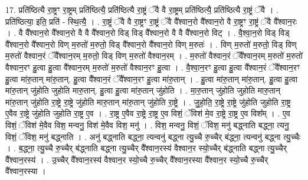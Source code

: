 \documentclass[17pt]{extarticle}
\begin{document}
17. प्रति॑ष्ठित्यै रा॒ष्ट्रꣳ रा॒ष्ट्रम् प्रति॑ष्ठित्यै॒ प्रति॑ष्ठित्यै रा॒ष्ट्रं ॅवै वै रा॒ष्ट्रम् प्रति॑ष्ठित्यै॒ प्रति॑ष्ठित्यै रा॒ष्ट्रं ॅवै । . प्रति॑ष्ठित्या॒ इति॒ प्रति॑ - स्थि॒त्यै॒ । . रा॒ष्ट्रं ॅवै वै रा॒ष्ट्रꣳ रा॒ष्ट्रं ॅवै वै᳚श्वान॒रो वै᳚श्वान॒रो वै रा॒ष्ट्रꣳ रा॒ष्ट्रं ॅवै वै᳚श्वान॒रः । . वै वै᳚श्वान॒रो वै᳚श्वान॒रो वै वै वै᳚श्वान॒रो विड् विड् वै᳚श्वान॒रो वै वै वै᳚श्वान॒रो विट् । . वै॒श्वा॒न॒रो विड् विड् वै᳚श्वान॒रो वै᳚श्वान॒रो विण् म॒रुतो॑ म॒रुतो॒ विड् वै᳚श्वान॒रो वै᳚श्वान॒रो विण् म॒रुतः॑ । . विण् म॒रुतो॑ म॒रुतो॒ विड् विण् म॒रुतो॑ वैश्वान॒रं ॅवै᳚श्वान॒रम् म॒रुतो॒ विड् विण् म॒रुतो॑ वैश्वान॒रम् । . म॒रुतो॑ वैश्वान॒रं ॅवै᳚श्वान॒रम् म॒रुतो॑ म॒रुतो॑ वैश्वान॒रꣳ हु॒त्वा हु॒त्वा वै᳚श्वान॒रम् म॒रुतो॑ म॒रुतो॑ वैश्वान॒रꣳ हु॒त्वा । . वै॒श्वा॒न॒रꣳ हु॒त्वा हु॒त्वा वै᳚श्वान॒रं ॅवै᳚श्वान॒रꣳ हु॒त्वा मा॑रु॒तान् मा॑रु॒तान्. हु॒त्वा वै᳚श्वान॒रं ॅवै᳚श्वान॒रꣳ हु॒त्वा मा॑रु॒तान् । . हु॒त्वा मा॑रु॒तान् मा॑रु॒तान्. हु॒त्वा हु॒त्वा मा॑रु॒तान् जु॑होति जुहोति मारु॒तान्. हु॒त्वा हु॒त्वा मा॑रु॒तान् जु॑होति । . मा॒रु॒तान् जु॑होति जुहोति मारु॒तान् मा॑रु॒तान् जु॑होति रा॒ष्ट्रे रा॒ष्ट्रे जु॑होति मारु॒तान् मा॑रु॒तान् जु॑होति रा॒ष्ट्रे । . जु॒हो॒ति॒ रा॒ष्ट्रे रा॒ष्ट्रे जु॑होति जुहोति रा॒ष्ट्र ए॒वैव रा॒ष्ट्रे जु॑होति जुहोति रा॒ष्ट्र ए॒व । . रा॒ष्ट्र ए॒वैव रा॒ष्ट्रे रा॒ष्ट्र ए॒व विशं॒ ॅविश॑ मे॒व रा॒ष्ट्रे रा॒ष्ट्र ए॒व विश᳚म् । . ए॒व विशं॒ ॅविश॑ मे॒वैव विश॒ मन्वनु॒ विश॑ मे॒वैव विश॒ मनु॑ । . विश॒ मन्वनु॒ विशं॒ ॅविश॒ मनु॑ बद्ध्नाति बद्ध्ना॒ त्यनु॒ विशं॒ ॅविश॒ मनु॑ बद्ध्नाति । . अनु॑ बद्ध्नाति बद्ध्ना॒ त्यन्वनु॑ बद्ध्ना त्यु॒च्चै रु॒च्चैर् ब॑द्ध्ना॒ त्यन्वनु॑ बद्ध्ना त्यु॒च्चैः । . ब॒द्ध्ना॒ त्यु॒च्चै रु॒च्चैर् ब॑द्ध्नाति बद्ध्ना त्यु॒च्चैर् वै᳚श्वान॒रस्य॑ वैश्वान॒र स्यो॒च्चैर् ब॑द्ध्नाति बद्ध्ना त्यु॒च्चैर् वै᳚श्वान॒रस्य॑ । . उ॒च्चैर् वै᳚श्वान॒रस्य॑ वैश्वान॒र स्यो॒च्चै रु॒च्चैर् वै᳚श्वान॒रस्या वै᳚श्वान॒र स्यो॒च्चै रु॒च्चैर् वै᳚श्वान॒रस्या । \newline
\end{document}
